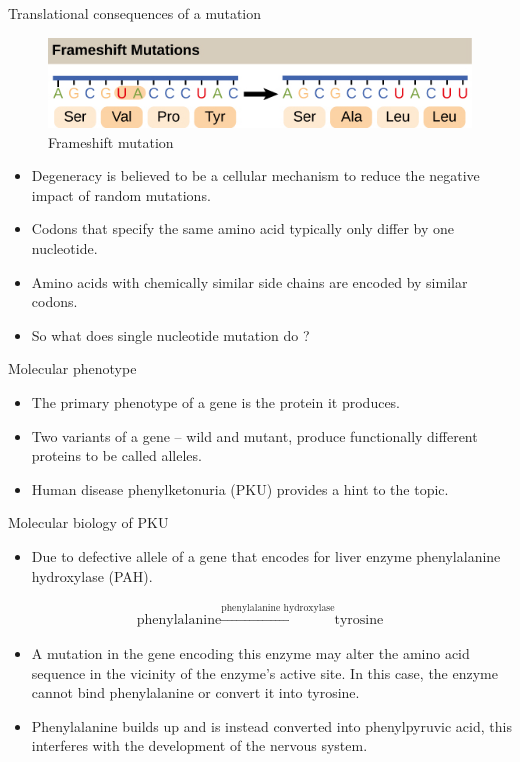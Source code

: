 \documentclass[11pt,dvipsnames,ignorenonframetext,aspectratio=169]{beamer}
\providecommand{\tightlist}{%
  \setlength{\itemsep}{0pt}\setlength{\parskip}{0pt}}
\begin{document}
\begin{frame}{Translational consequences of a mutation}
\protect\hypertarget{translational-consequences-of-a-mutation}{}
\begin{figure}
\includegraphics[width=0.45\linewidth]{./../images/frameshift_mutation} \caption{Frameshift mutation}\label{fig:frameshift-mutation}
\end{figure}

\begin{itemize}
\tightlist
\item
  Degeneracy is believed to be a cellular mechanism to reduce the
  negative impact of random mutations.
\item
  Codons that specify the same amino acid typically only differ by one
  nucleotide.
\item
  Amino acids with chemically similar side chains are encoded by similar
  codons.
\item
  So what does single nucleotide mutation do ?
\end{itemize}
\end{frame}

\begin{frame}{Molecular phenotype}
\protect\hypertarget{molecular-phenotype}{}
\begin{itemize}
\tightlist
\item
  The primary phenotype of a gene is the protein it produces.
\item
  Two variants of a gene -- wild and mutant, produce functionally
  different proteins to be called alleles.
\item
  Human disease phenylketonuria (PKU) provides a hint to the topic.
\end{itemize}
\end{frame}

\begin{frame}{Molecular biology of PKU}
\protect\hypertarget{molecular-biology-of-pku}{}
\begin{itemize}
\tightlist
\item
  Due to defective allele of a gene that encodes for liver enzyme
  phenylalanine hydroxylase (PAH).
\end{itemize}

\[
\begin{aligned}
\textrm{phenylalanine} \xrightarrow{\text{phenylalanine hydroxylase}} \textrm{tyrosine}
\end{aligned}
\]

\begin{itemize}
\tightlist
\item
  A mutation in the gene encoding this enzyme may alter the amino acid
  sequence in the vicinity of the enzyme's active site. In this case,
  the enzyme cannot bind phenylalanine or convert it into tyrosine.
\item
  Phenylalanine builds up and is instead converted into phenylpyruvic
  acid, this interferes with the development of the nervous system.
\end{itemize}
\end{frame}
\end{document}
